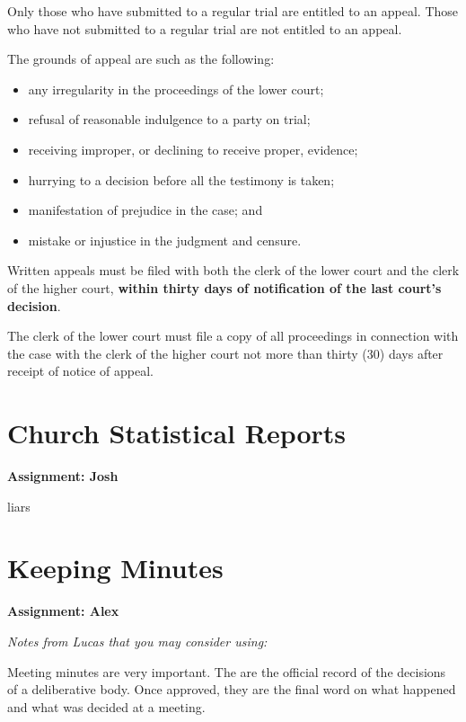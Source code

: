 \documentclass[
]{book}
\providecommand{\tightlist}{%
  \setlength{\itemsep}{0pt}\setlength{\parskip}{0pt}}
\begin{document}
Only those who have submitted to a regular trial are entitled to an appeal. Those who have not submitted to a regular trial are not entitled to an appeal.

The grounds of appeal are such as the following:

\begin{itemize}
\tightlist
\item
  any irregularity in the proceedings of the lower court;
\item
  refusal of reasonable indulgence to a party on trial;
\item
  receiving improper, or declining to receive proper, evidence;
\item
  hurrying to a decision before all the testimony is taken;
\item
  manifestation of prejudice in the case; and
\item
  mistake or injustice in the judgment and censure.
\end{itemize}

Written appeals must be filed with both the clerk of the lower court and the clerk of the higher court, \textbf{within thirty days of notification of the last court's decision}.

The clerk of the lower court must file a copy of all proceedings in connection with the case with the clerk of the higher court not more than thirty (30) days after receipt of notice of appeal.

\hypertarget{church-statistical-reports}{%
\chapter{Church Statistical Reports}\label{church-statistical-reports}}

\textbf{Assignment: Josh}

liars

\hypertarget{keeping-minutes}{%
\chapter{Keeping Minutes}\label{keeping-minutes}}

\textbf{Assignment: Alex}

\emph{Notes from Lucas that you may consider using:}

Meeting minutes are very important. The are the official record of the decisions of a deliberative body. Once approved, they are the final word on what happened and what was decided at a meeting.
\end{document}
